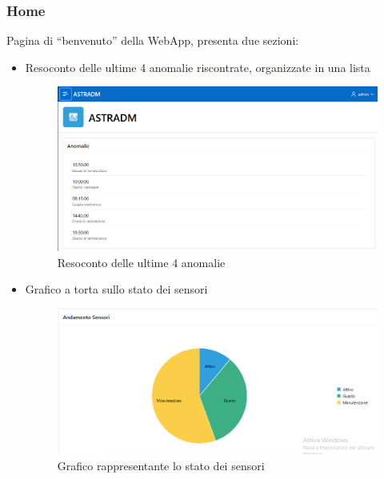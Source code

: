 \subsubsection{Home}
Pagina di ``benvenuto'' della WebApp, presenta due sezioni:
\begin{itemize}
\item Resoconto delle ultime 4 anomalie riscontrate, organizzate in
  una lista
  \begin{figure}[ht]
    \centering
    \includegraphics[width=\linewidth]{images/home-anomalie.png}
    \caption{Resoconto delle ultime 4 anomalie}
    \label{fig:anomalie}
  \end{figure}
\item Grafico a torta sullo stato dei sensori
  \begin{figure}[ht]
    \centering
    \includegraphics[width=\linewidth]{images/home-sensori.png}
    \caption{Grafico rappresentante lo stato dei sensori}
    \label{fig:sensori}
  \end{figure}
\end{itemize}
